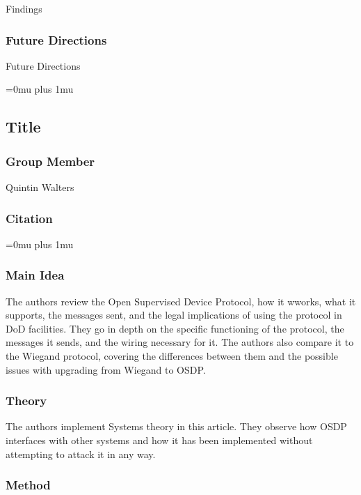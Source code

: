 \noindent
Findings

\subsubsection{Future Directions}

\noindent
Future Directions 

\Urlmuskip=0mu plus 1mu\relax

\noindent
\subsection{Title}

\subsubsection{Group Member}

\noindent
Quintin Walters

\noindent
\subsubsection{Citation}

\Urlmuskip=0mu plus 1mu\relax

\subsubsection{Main Idea}

\noindent
The authors review the Open Supervised Device Protocol, how it wworks, what it supports, the messages sent, and the legal implications of using the protocol in DoD facilities.  They go in depth on the specific functioning of the protocol, the messages it sends, and the wiring necessary for it.  The authors also compare it to the Wiegand protocol, covering the differences between them and the possible issues with upgrading from Wiegand to OSDP.

\subsubsection{Theory}

\noindent
The authors implement Systems theory in this article.  They observe how OSDP interfaces with other systems and how it has been implemented without attempting to attack it in any way.

\subsubsection{Method}

